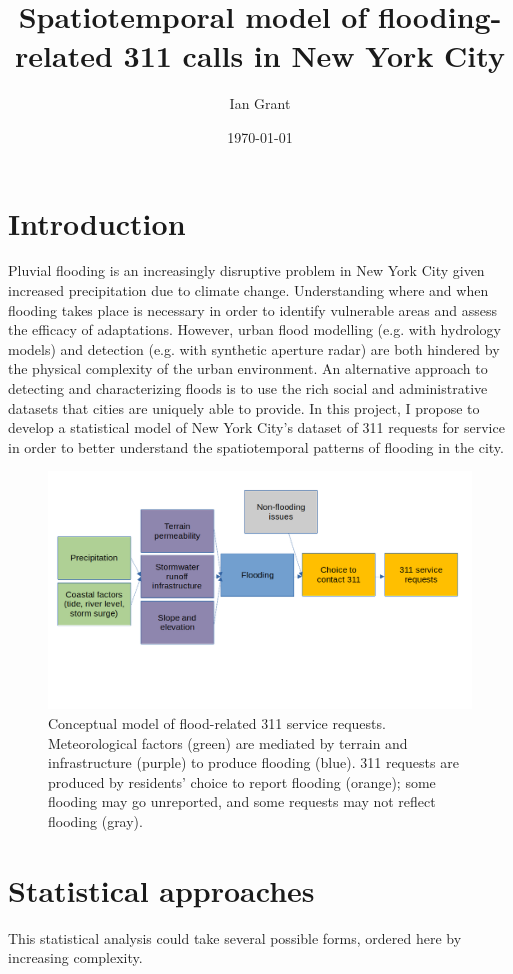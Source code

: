 \documentclass[11pt]{article}
\author{Ian Grant}
\date{\today}
\title{Spatiotemporal model of flooding-related 311 calls in New York City}
\begin{document}
\maketitle

\section{Introduction}
\label{sec:orge386669}
Pluvial flooding is an increasingly disruptive problem in New York City given increased precipitation due to climate change. Understanding where and when flooding takes place is necessary in order to identify vulnerable areas and assess the efficacy of adaptations. However, urban flood modelling (e.g. with hydrology models) and detection (e.g. with synthetic aperture radar) are both hindered by the physical complexity of the urban environment. An alternative approach to detecting and characterizing floods is to use the rich social and administrative datasets that cities are uniquely able to provide. In this project, I propose to develop a statistical model of New York City's dataset of 311 requests for service in order to better understand the spatiotemporal patterns of flooding in the city.

\begin{figure}[htbp]
\centering
\includegraphics[width=.9\linewidth]{flooding_proposal_conceptual_model.png}
\caption{\label{fig:orgbcdf9af}Conceptual model of flood-related 311 service requests. Meteorological factors (green) are mediated by terrain and infrastructure (purple) to produce flooding (blue). 311 requests are produced by residents' choice to report flooding (orange); some flooding may go unreported, and some requests may not reflect flooding (gray).}
\end{figure}

\section{Statistical approaches}
\label{sec:orgaf7c9d3}
This statistical analysis could take several possible forms, ordered
here by increasing complexity.
\end{document}
